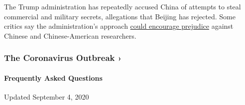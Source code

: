 The Trump administration has repeatedly accused China of attempts to
steal commercial and military secrets, allegations that Beijing has
rejected. Some critics say the administration's approach
\href{https://www.nytimes3xbfgragh.onion/2020/03/23/us/chinese-coronavirus-racist-attacks.html}{could
encourage prejudice} against Chinese and Chinese-American researchers.

\href{https://www.nytimes3xbfgragh.onion/news-event/coronavirus?action=click\&pgtype=Article\&state=default\&region=MAIN_CONTENT_3\&context=storylines_faq}{}

\hypertarget{the-coronavirus-outbreak-}{%
\subsubsection{The Coronavirus Outbreak
›}\label{the-coronavirus-outbreak-}}

\hypertarget{frequently-asked-questions}{%
\paragraph{Frequently Asked
Questions}\label{frequently-asked-questions}}

Updated September 4, 2020

